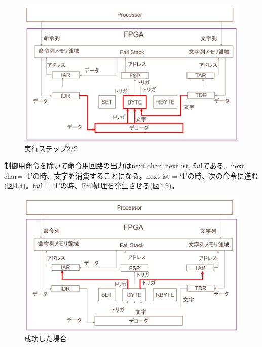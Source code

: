 \documentclass[12pt,oneside]{report}
\begin{document}
\begin{figure}[t]
    \begin{center}
        \includegraphics[width=130mm]{./fig/step2_2.png}
       \caption{実行ステップ2/2}
        \label{fig:step2_2}
    \end{center}
\end{figure}



制御用命令を除いて命令用回路の出力はnext char, next ist, failである。next char= `1'の時、文字を消費することになる。next ist = `1'の時、次の命令に進む(図4.4)。fail = `1'の時、Fail処理を発生させる(図4.5)。\\
\begin{figure}[t]
    \begin{center}
        \includegraphics[width=130mm]{./fig/succ.png}
       \caption{成功した場合}
        \label{fig:succ}
    \end{center}
\end{figure}
\end{document}
